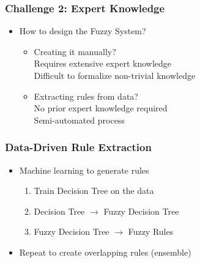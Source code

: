 \documentclass[
	10pt,
	t		%
]{beamer}
\newcommand{\xmark}{\ding{55}}%
\newcommand{\cmark}{\ding{51}}%
\begin{document}
\begin{frame}
	\frametitle{Challenge 2: Expert Knowledge}
	
	\begin{itemize}
		\item How to design the Fuzzy System?
		      \begin{itemize}
			      \item Creating it manually?\\
			            \quad \xmark \; Requires extensive expert knowledge\\
			            \quad \xmark \; Difficult to formalize non-trivial knowledge
			      \item Extracting rules from data?\\
			            \quad \cmark \; No prior expert knowledge required\\
			            \quad \cmark \; Semi-automated process\\
		      \end{itemize}
	\end{itemize}
\end{frame}


\begin{frame}
	\frametitle{Data-Driven Rule Extraction}
	\begin{itemize}
		\item Machine learning to generate rules {\scriptsize  \cite{CROCKETT20062809}}
		      \begin{enumerate}
			      \item Train Decision Tree on the data
			      \item Decision Tree $\rightarrow$ Fuzzy Decision Tree
			      \item Fuzzy Decision Tree $\rightarrow$ Fuzzy Rules
		      \end{enumerate}
		\item Repeat to create overlapping rules (ensemble)
	\end{itemize}
\end{frame}
\end{document}
